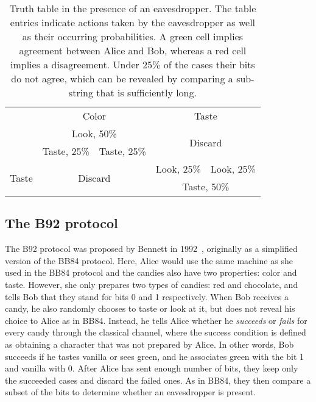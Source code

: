 \documentclass{article}
\begin{document}
\begin{table}[h!]
	\centering
	\begin{tabular}{ |c | c|c|c|c| } 
		\hline
		\backslashbox{Bob}{Alice} & \multicolumn{2}{|c|}{Color} & \multicolumn{2}{|c|}{Taste} \\ 
		\hhline{*{5}{-}}
		\multirow{2}{5em}{Look} &  \multicolumn{2}{|c|}{ \cellcolor[HTML]{9af9a1} Look, 50\% } & \multicolumn{2}{|c|}{\multirow{2}{*}{Discard}} \\
		\cline{2-3}
		& \cellcolor[HTML]{f7bebe} Taste, 25\% & \cellcolor[HTML]{9af9a1} Taste, 25\% & \multicolumn{2}{|c|}{} \\
		\hline
		\multirow{2}{5em}{Taste} & \multicolumn{2}{|c|}{\multirow{2}{*}{Discard}} & \cellcolor[HTML]{f7bebe} Look, 25\% & \cellcolor[HTML]{9af9a1} Look, 25\% \\ 
		\hhline{| ~ | ~  ~ | - | - |}
		& \multicolumn{2}{|c|}{} & \multicolumn{2}{|c|}{ \cellcolor[HTML]{9af9a1} Taste, 50\%} \\
		\hline
	\end{tabular}
	\caption{Truth table in the presence of an eavesdropper. The table entries indicate actions taken by the eavesdropper as well as their occurring probabilities. A green cell implies agreement between Alice and Bob, whereas a red cell implies a disagreement. Under 25\% of the cases their bits do not agree, which can be revealed by comparing a sub-string that is sufficiently long.}
	\label{table2}
\end{table}

\subsection{The B92 protocol}
The B92 protocol was proposed by Bennett in 1992~\cite{bennett1992quantum}, originally as a simplified version of the BB84 protocol.
Here, Alice would use the same machine as she used in the BB84 protocol and the candies also have two properties: color and taste.
However, she only prepares two types of candies: red and chocolate, and tells Bob that they stand for bits 0 and 1 respectively.
When Bob receives a candy, he also randomly chooses to taste or look at it, but does not reveal his choice to Alice as in BB84.
Instead, he tells Alice whether he \textit{succeeds} or \textit{fails} for every candy through the classical channel, where the success condition is defined as obtaining a character that was not prepared by Alice.
In other words, Bob succeeds if he tastes vanilla or sees green, and he associates green with the bit 1 and vanilla with 0.
After Alice has sent enough number of bits, they keep only the succeeded cases and discard the failed ones.
As in BB84, they then compare a subset of the bits to determine whether an eavesdropper is present.
\end{document}
